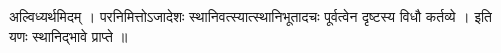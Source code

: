 अल्विध्यर्थमिदम् । परनिमित्तोऽजादेशः स्थानिवत्स्यात्स्थानिभूतादचः
पूर्वत्वेन दृष्टस्य विधौ कर्तव्ये । इति यणः स्थानिद्भावे प्राप्ते ॥
